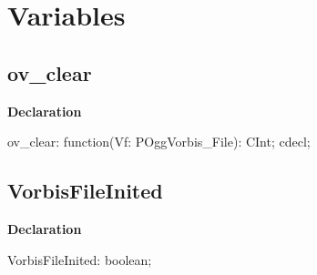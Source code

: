\documentclass{report}
\newif\ifpdf
\begin{document}
\section{Variables}
\ifpdf
\subsection*{\large{\textbf{ov{\_}clear}}\normalsize\hspace{1ex}\hrulefill}
\else
\subsection*{ov{\_}clear}
\fi
\label{ok_vorbisfile-ov_clear}
\begin{list}{}{
\setlength{\itemindent}{0cm}
\setlength{\listparindent}{0cm}
\setlength{\leftmargin}{\evensidemargin}
\addtolength{\leftmargin}{\tmplength}
\settowidth{\labelsep}{X}
\addtolength{\leftmargin}{\labelsep}
\setlength{\labelwidth}{\tmplength}
}
\item[\textbf{Declaration}\hfill]
\ifpdf
\begin{flushleft}
\fi
\begin{ttfamily}
ov{\_}clear: function(Vf: POggVorbis{\_}File): CInt; cdecl;\end{ttfamily}

\ifpdf
\end{flushleft}
\fi

\end{list}
\ifpdf
\subsection*{\large{\textbf{VorbisFileInited}}\normalsize\hspace{1ex}\hrulefill}
\else
\subsection*{VorbisFileInited}
\fi
\label{ok_vorbisfile-VorbisFileInited}
\begin{list}{}{
\setlength{\itemindent}{0cm}
\setlength{\listparindent}{0cm}
\setlength{\leftmargin}{\evensidemargin}
\addtolength{\leftmargin}{\tmplength}
\settowidth{\labelsep}{X}
\addtolength{\leftmargin}{\labelsep}
\setlength{\labelwidth}{\tmplength}
}
\item[\textbf{Declaration}\hfill]
\ifpdf
\begin{flushleft}
\fi
\begin{ttfamily}
VorbisFileInited: boolean;\end{ttfamily}

\ifpdf
\end{flushleft}
\fi

\end{list}
\end{document}
